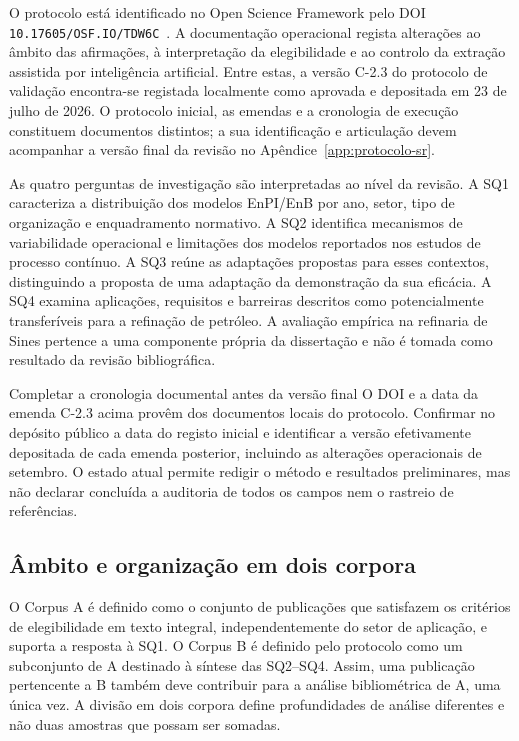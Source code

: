 O protocolo está identificado no Open Science Framework pelo DOI
\nolinkurl{10.17605/OSF.IO/TDW6C}~\cite{Ribeiro2026Protocolo}.
A documentação operacional regista alterações ao âmbito das afirmações,
à interpretação da elegibilidade e ao controlo da extração assistida por
inteligência artificial. Entre estas, a versão C-2.3 do protocolo de
validação encontra-se registada localmente como aprovada e depositada em
23 de julho de 2026. O protocolo inicial, as emendas e a cronologia de
execução constituem documentos distintos; a sua identificação e articulação
devem acompanhar a versão final da revisão no Apêndice~\ref{app:protocolo-sr}.

As quatro perguntas de investigação são interpretadas ao nível da revisão.
A SQ1 caracteriza a distribuição dos modelos EnPI/EnB por ano, setor, tipo
de organização e enquadramento normativo. A SQ2 identifica mecanismos de
variabilidade operacional e limitações dos modelos reportados nos estudos
de processo contínuo. A SQ3 reúne as adaptações propostas para esses
contextos, distinguindo a proposta de uma adaptação da demonstração da sua
eficácia. A SQ4 examina aplicações, requisitos e barreiras descritos como
potencialmente transferíveis para a refinação de petróleo. A avaliação
empírica na refinaria de Sines pertence a uma componente própria da
dissertação e não é tomada como resultado da revisão bibliográfica.

{Completar a cronologia documental antes da versão final}
{O DOI e a data da emenda C-2.3 acima provêm dos documentos locais do
protocolo. Confirmar no depósito público a data do registo inicial e
identificar a versão efetivamente depositada de cada emenda posterior,
incluindo as alterações operacionais de setembro. O estado atual permite
redigir o método e resultados preliminares, mas não declarar concluída
a auditoria de todos os campos nem o rastreio de referências.}%

\subsection{Âmbito e organização em dois corpora}

O Corpus A é definido como o conjunto de publicações que satisfazem os
critérios de elegibilidade em texto integral, independentemente do setor
de aplicação, e suporta a resposta à SQ1. O Corpus B é definido pelo
protocolo como um subconjunto de A destinado à síntese das SQ2--SQ4.
Assim, uma publicação pertencente a B também deve contribuir para a
análise bibliométrica de A, uma única vez. A divisão em dois corpora
define profundidades de análise diferentes e não duas amostras que
possam ser somadas.

